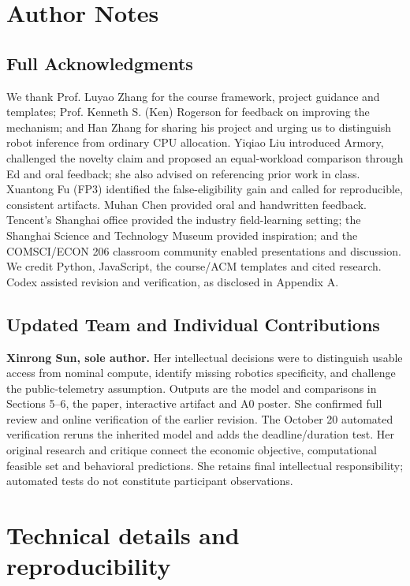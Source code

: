 \section*{Author Notes}
\subsection*{Full Acknowledgments}
We thank Prof. Luyao Zhang for the course framework, project guidance and templates; Prof. Kenneth S. (Ken) Rogerson for feedback on improving the mechanism; and Han Zhang for sharing his project and urging us to distinguish robot inference from ordinary CPU allocation. Yiqiao Liu introduced Armory, challenged the novelty claim and proposed an equal-workload comparison through Ed and oral feedback; she also advised on referencing prior work in class. Xuantong Fu (FP3) identified the false-eligibility gain and called for reproducible, consistent artifacts. Muhan Chen provided oral and handwritten feedback. Tencent's Shanghai office provided the industry field-learning setting; the Shanghai Science and Technology Museum provided inspiration; and the COMSCI/ECON 206 classroom community enabled presentations and discussion. We credit Python, JavaScript, the course/ACM templates and cited research. Codex assisted revision and verification, as disclosed in Appendix A.

\subsection*{Updated Team and Individual Contributions}
\textbf{Xinrong Sun, sole author.} Her intellectual decisions were to distinguish usable access from nominal compute, identify missing robotics specificity, and challenge the public-telemetry assumption. Outputs are the model and comparisons in Sections 5--6, the paper, interactive artifact and A0 poster. She confirmed full review and online verification of the earlier revision. The October 20 automated verification reruns the inherited model and adds the deadline/duration test. Her original research and critique connect the economic objective, computational feasible set and behavioral predictions. She retains final intellectual responsibility; automated tests do not constitute participant observations.

\appendix
\section{Technical details and reproducibility}
